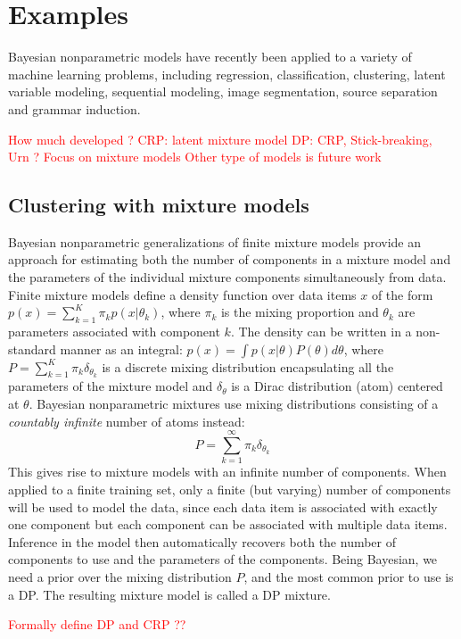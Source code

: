 \section{Examples}
Bayesian nonparametric models have recently been applied to a variety of machine learning problems, including regression, classification, clustering, latent variable modeling, sequential modeling, image segmentation, source separation and grammar induction.

\textcolor{red}{How much developed ?
CRP: latent mixture model
DP: CRP, Stick-breaking, Urn ?
Focus on mixture models
Other type of models is future work}

\subsection{Clustering with mixture models}
Bayesian nonparametric generalizations of finite mixture models provide an approach for estimating both the number of components in a mixture model and the parameters of the individual mixture components simultaneously from data. Finite mixture models define a density function over data items $x$ of the form $p(x) = \sum_{k=1}^K \pi_k p(x|\theta_k)$, where $\pi_k$ is the mixing proportion and $\theta_k$ are parameters associated with component $k$. The density can be written in a non-standard manner as an integral: $p(x) = \int p(x|\theta) P(\theta)d\theta$, where $P = \sum_{k=1}^K \pi_k \delta_{\theta_k}$ is a discrete mixing distribution encapsulating all the parameters of the mixture model and $\delta_\theta$ is a Dirac distribution (atom) centered at $\theta$. Bayesian nonparametric mixtures use mixing distributions consisting of a \textit{countably infinite} number of atoms instead:
$$ P = \sum_{k = 1}^\infty \pi_k \delta_{\theta_k} $$
This gives rise to mixture models with an infinite number of components. When applied to a finite training set, only a finite (but varying) number of components will be used to model the data, since each data item is associated with exactly one component but each component can be associated with multiple data items. Inference in the model then automatically recovers both the number of components to use and the parameters of the components. Being Bayesian, we need a prior over the mixing distribution $P$, and the most common prior to use is a \gls{DP}. The resulting mixture model is called a \gls{DP} mixture.

\textcolor{red}{Formally define DP and CRP ??}


